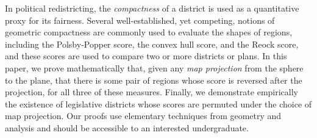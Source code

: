 In political redistricting, the \textit{compactness} of a district is
used as a quantitative proxy for its fairness.  Several
well-established, yet competing, notions of geometric compactness are
commonly used to evaluate the shapes of regions, including the
Polsby-Popper score, the convex hull score, and the Reock score, and
these scores are used to compare two or more districts or plans.  In
this paper, we prove mathematically that, given any \textit{map
projection} from the sphere to the plane, that there is some pair of
regions whose score is reversed after the projection, for all three of
these measures.  Finally, we demonstrate empirically the existence of
legislative districts whose scores are permuted under the choice of
map projection.  Our proofs use elementary techniques from geometry
and analysis and should be accessible to an interested undergraduate.

